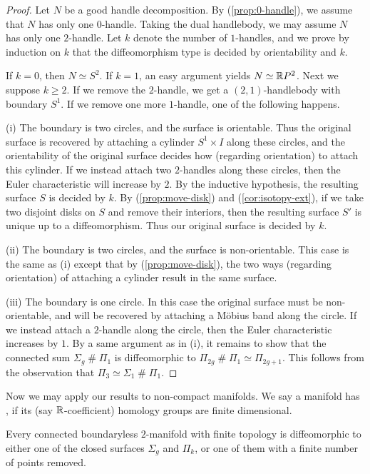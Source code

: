 \begin{proof}
Let $N$ be a good handle decomposition.
By (\ref{prop:0-handle}), we assume that $N$ has only one $0$-handle.
Taking the dual handlebody, we may assume $N$ has only one $2$-handle.
Let $k$ denote the number of $1$-handles, and we prove by induction on $k$
that the diffeomorphism type is decided by orientability and $k$.

If $k=0$, then $N\simeq S^2$. If $k=1$, an easy argument yields $N\simeq\mathbb{R} P^2$.
Next we suppose $k\geq2$.
If we remove the $2$-handle, we get a $(2,1)$-handlebody with boundary $S^1$.
If we remove one more $1$-handle, one of the following happens.

(i) The boundary is two circles, and the surface is orientable.
Thus the original surface is recovered by attaching a cylinder $S^1\times I$ along these circles,
and the orientability of the original surface decides how (regarding orientation) to attach this cylinder.
If we instead attach two $2$-handles along these circles,
then the Euler characteristic will increase by $2$.
By the inductive hypothesis, the resulting surface $S$ is decided by $k$.
By (\ref{prop:move-disk}) and (\ref{cor:isotopy-ext}),
if we take two disjoint disks on $S$ and remove their interiors,
then the resulting surface $S'$ is unique up to a diffeomorphism.
Thus our original surface is decided by $k$.

(ii) The boundary is two circles, and the surface is non-orientable.
This case is the same as (i) except that by (\ref{prop:move-disk}),
the two ways (regarding orientation) of attaching a cylinder result in the same surface.

(iii) The boundary is one circle.
In this case the original surface must be non-orientable,
and will be recovered by attaching a M\"obius band along the circle.
If we instead attach a $2$-handle along the circle,
then the Euler characteristic increases by $1$.
By a same argument as in (i),
it remains to show that the connected sum $\Sigma_g\mathbin\#\Pi_1$
is diffeomorphic to $\Pi_{2g}\mathbin\#\Pi_1\simeq\Pi_{2g+1}$.
This follows from the observation that $\Pi_3\simeq\Sigma_1\mathbin\#\Pi_1$.
\end{proof}

Now we may apply our results to non-compact manifolds.
We say a manifold has ,
if its (say $\mathbb{R}$-coefficient) homology groups are finite dimensional.

\begin{theorem}
Every connected boundaryless $2$-manifold with finite topology
is diffeomorphic to either one of the closed surfaces $\Sigma_g$ and $\Pi_k$,
or one of them with a finite number of points removed.
\end{theorem}

